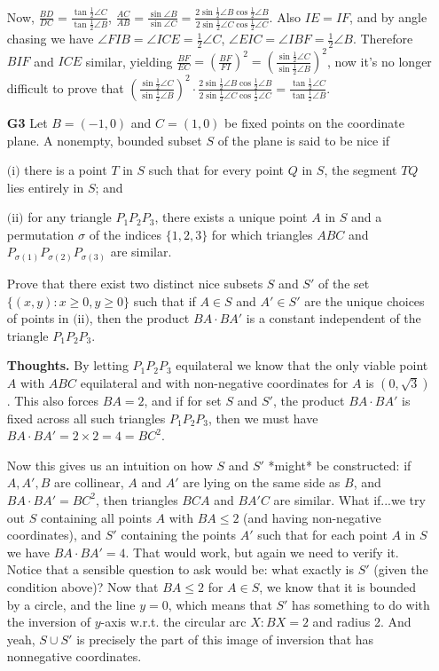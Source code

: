 \documentclass[11pt,a4paper]{article}
\begin{document}
\begin{itemize}
Now, $\frac{BD}{DC}=\frac{\tan\frac12\angle C}{\tan\frac12\angle B}$,
$\frac{AC}{AB}=\frac{\sin\angle B}{\sin\angle C}=\frac{2\sin\frac 12\angle B\cos\frac 12\angle B}{2\sin\frac 12\angle C\cos\frac 12\angle C}$.
Also $IE=IF$, and by angle chasing we have $\angle FIB=\angle ICE=\frac12\angle C$,
$\angle EIC=\angle IBF=\frac12\angle B$.
Therefore $BIF$ and $ICE$ similar, yielding $\frac{BF}{EC}=(\frac{BF}{FI})^2=(\frac{\sin\frac12\angle C}{\sin\frac12\angle B})^2$,
now it's no longer difficult to prove that $(\frac{\sin\frac12\angle C}{\sin\frac12\angle B})^2\cdot \frac{2\sin\frac 12\angle B\cos\frac 12\angle B}{2\sin\frac 12\angle C\cos\frac 12\angle C}=\frac{\tan\frac12\angle C}{\tan\frac12\angle B}$.

\newpage

\item[\textbf{G3}]
Let $B = (-1, 0)$ and $C = (1, 0)$ be fixed points on the coordinate plane. A nonempty, bounded subset $S$ of the plane is said to be nice if

$\text{(i)}$ there is a point $T$ in $S$ such that for every point $Q$ in $S$, the segment $TQ$ lies entirely in $S$; and

$\text{(ii)}$ for any triangle $P_1P_2P_3$, there exists a unique point $A$ in $S$ and a permutation $\sigma$ of the indices $\{1, 2, 3\}$ for which triangles $ABC$ and $P_{\sigma(1)}P_{\sigma(2)}P_{\sigma(3)}$ are similar.

Prove that there exist two distinct nice subsets $S$ and $S'$ of the set $\{(x, y) : x \geq 0, y \geq 0\}$ such that if $A \in S$ and $A' \in S'$ are the unique choices of points in $\text{(ii)}$, then the product $BA \cdot BA'$ is a constant independent of the triangle $P_1P_2P_3$.

\textbf{Thoughts.} 
By letting $P_1P_2P_3$ equilateral we know that the only viable point $A$ with $ABC$ equilateral and with non-negative coordinates for $A$ is $(0, \sqrt{3})$. This also forces $BA=2$, and if for set $S$ and $S'$, the product $BA\cdot BA'$ is fixed across all such triangles $P_1P_2P_3$, then we must have $BA\cdot BA'=2\times 2=4=BC^2$. 

Now this gives us an intuition on how $S$ and $S'$ *might* be constructed: if $A, A', B$ are collinear, $A$ and $A'$ are lying on the same side as $B$, and $BA\cdot BA'=BC^2$, then triangles $BCA$ and $BA'C$ are similar. What if...we try out $S$ containing all points $A$ with $BA\le 2$ (and having non-negative coordinates), and $S'$ containing the points $A'$ such that for each point $A$ in $S$ we have $BA\cdot BA'=4$. That would work, but again we need to verify it. Notice that a sensible question to ask would be: what exactly is $S'$ (given the condition above)? Now that $BA\le 2$ for $A\in S$, we know that it is bounded by a circle, and the line $y=0$, which means that $S'$ has something to do with the inversion of $y$-axis w.r.t. the circular arc $X: BX=2$ and radius 2. And yeah, $S\cup S'$ is precisely the part of this image of inversion that has nonnegative coordinates.


\end{itemize}
\end{document}
